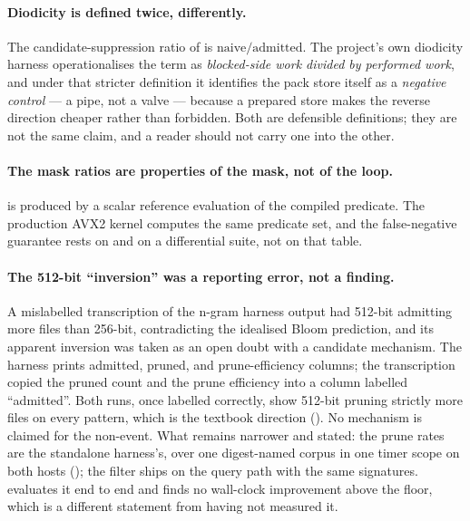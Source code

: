 \documentclass[11pt,letterpaper]{article}
\begin{document}
\paragraph{Diodicity is defined twice, differently.}
The candidate-suppression ratio of  is
$\text{naive}/\text{admitted}$. The project's own diodicity harness
operationalises the term as \emph{blocked-side work divided by performed
work}, and under that stricter definition it identifies the pack store
itself as a \emph{negative control} --- a pipe, not a valve --- because a
prepared store makes the reverse direction cheaper rather than forbidden.
Both are defensible definitions; they are not the same claim, and a reader
should not carry one into the other.

\paragraph{The mask ratios are properties of the mask, not of the loop.}
 is produced by a scalar reference evaluation of the compiled
predicate. The production AVX2 kernel computes the same predicate set, and
the false-negative guarantee rests on  and on a differential
suite, not on that table.

\paragraph{The 512-bit ``inversion'' was a reporting error, not a finding.}
A mislabelled transcription of the n-gram harness output had 512-bit
admitting more files than 256-bit, contradicting the idealised Bloom
prediction, and its apparent inversion was taken as an open doubt with a
candidate mechanism. The harness prints admitted, pruned, and
prune-efficiency columns; the transcription copied the
pruned count and the prune efficiency into a column labelled ``admitted''.
Both runs, once labelled correctly, show 512-bit pruning strictly more
files on every pattern, which is the textbook direction
(). No mechanism is claimed for the non-event.
What remains narrower and stated: the prune rates are the standalone
harness's, over one digest-named corpus in one timer scope on both hosts
(); the filter ships on the query path with the same
signatures.  evaluates it end to end and finds no
wall-clock improvement above the floor, which is a different statement from
having not measured it.
\end{document}

